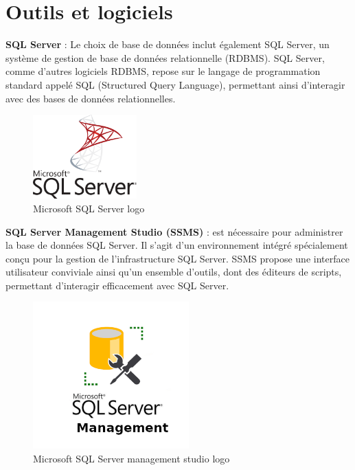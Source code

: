 \section{Outils et logiciels}


\textbf{SQL Server} : Le choix de base de données inclut également SQL Server, un système de gestion de base de données relationnelle (RDBMS). SQL Server, comme d'autres logiciels RDBMS, repose sur le langage de programmation standard appelé SQL (Structured Query Language), permettant ainsi d'interagir avec des bases de données relationnelles.
\\
\begin{figure}[H]
    \centering
    \includegraphics[width=4cm]{Figures/sqlserver.png}
    \caption{Microsoft SQL Server logo}
\end{figure}



\textbf{SQL Server Management Studio (SSMS)} : est nécessaire pour administrer la base de données SQL Server. Il s'agit d'un environnement intégré spécialement conçu pour la gestion de l'infrastructure SQL Server. SSMS propose une interface utilisateur conviviale ainsi qu'un ensemble d'outils, dont des éditeurs de scripts, permettant d'interagir efficacement avec SQL Server.
\\
\begin{figure}[H]
    \centering
    \includegraphics[width=6cm]{Figures/sqlmanagementstudio.png}
    \caption{Microsoft SQL Server management studio logo}
\end{figure}


